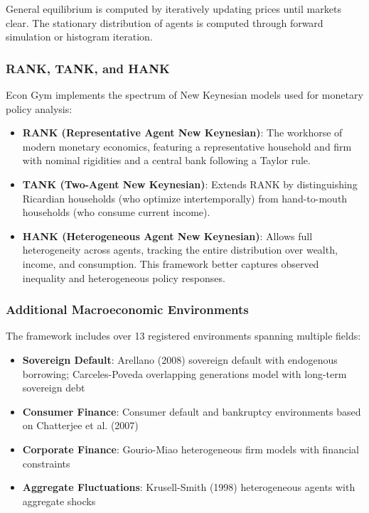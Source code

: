 \documentclass[12pt]{article}
\begin{document}
General equilibrium is computed by iteratively updating prices until markets clear. The stationary distribution of agents is computed through forward simulation or histogram iteration.

\subsubsection{RANK, TANK, and HANK}

Econ Gym implements the spectrum of New Keynesian models used for monetary policy analysis:

\begin{itemize}
    \item \textbf{RANK (Representative Agent New Keynesian)}: The workhorse of modern monetary economics, featuring a representative household and firm with nominal rigidities and a central bank following a Taylor rule.
    
    \item \textbf{TANK (Two-Agent New Keynesian)}: Extends RANK by distinguishing Ricardian households (who optimize intertemporally) from hand-to-mouth households (who consume current income).
    
    \item \textbf{HANK (Heterogeneous Agent New Keynesian)}: Allows full heterogeneity across agents, tracking the entire distribution over wealth, income, and consumption. This framework better captures observed inequality and heterogeneous policy responses.
\end{itemize}

\subsubsection{Additional Macroeconomic Environments}

The framework includes over 13 registered environments spanning multiple fields:
\begin{itemize}
    \item \textbf{Sovereign Default}: Arellano (2008) sovereign default with endogenous borrowing; Carceles-Poveda overlapping generations model with long-term sovereign debt
    \item \textbf{Consumer Finance}: Consumer default and bankruptcy environments based on Chatterjee et al. (2007)
    \item \textbf{Corporate Finance}: Gourio-Miao heterogeneous firm models with financial constraints
    \item \textbf{Aggregate Fluctuations}: Krusell-Smith (1998) heterogeneous agents with aggregate shocks
\end{itemize}
\end{document}
